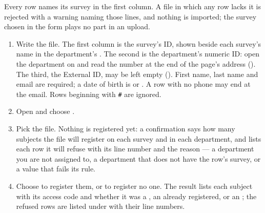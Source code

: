 \documentclass[11pt, a4paper]{article}
\begin{document}
\begin{center}\small
{}
\end{center}

Every row names its survey in the first column. A file in which any row lacks it is rejected
with a warning naming those lines, and nothing is imported; the survey chosen in the form plays
no part in an upload.

\begin{enumerate}
  \item Write the file. The first column is the survey's ID, shown beside each survey's name in
        the department's . The second is the department's numeric ID: open the
        department on  and read the number at the end of the page's address
        (). The third, the External ID, may be left empty
        (). First name, last name and email are required; a date of birth is
         or . A row with no phone may end at the email. Rows
        beginning with \texttt{\small\#} are ignored.
  \item Open  and choose .
  \item Pick the file. Nothing is registered yet: a confirmation says how many subjects the file
        will register on each survey and in each department, and lists each row it will refuse
        with its line number and the reason — a department you are not assigned to, a department
        that does not have the row's survey, or a value that fails its rule.
  \item Choose  to register them, or  to register no one. The result lists
        each subject with its access code and whether it was a , an
         already registered, or an ; the refused rows
        are listed under  with their line numbers.
\end{enumerate}


\end{document}
